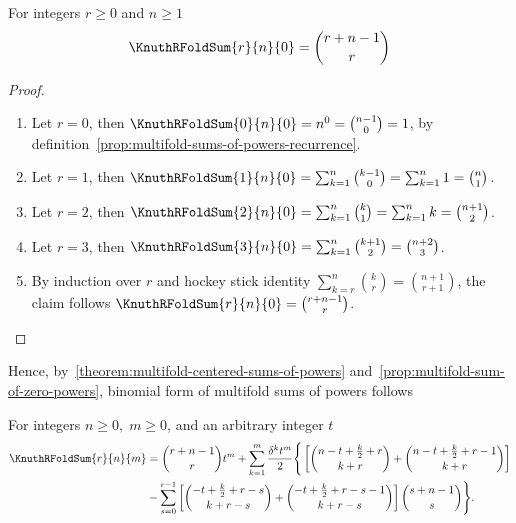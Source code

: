 \begin{proposition}
  \label{prop:multifold-sum-of-zero-powers}
  For integers $r \geq 0$ and $n\geq 1$
  \begin{align*}
    \KnuthRFoldSum{r}{n}{0} = \binom{r+n-1}{r}
  \end{align*}
  \begin{proof}
    \begin{enumerate}
      \item Let $r=0$, then $\KnuthRFoldSum{0}{n}{0}=n^0=\binom{n-1}{0} = 1$,
        by definition~\eqref{prop:multifold-sums-of-powers-recurrence}.
      \item Let $r=1$, then
        $\KnuthRFoldSum{1}{n}{0}
        = \sum_{k=1}^{n} \binom{k-1}{0}
        = \sum_{k=1}^{n} 1 = \binom{n}{1}$.
      \item Let $r=2$, then
        $\KnuthRFoldSum{2}{n}{0}= \sum_{k=1}^{n} \binom{k}{1}
        = \sum_{k=1}^{n} k = \binom{n+1}{2}$.
      \item Let $r=3$, then
        $\KnuthRFoldSum{3}{n}{0}
        = \sum_{k=1}^{n} \binom{k+1}{2}
        = \binom{n+2}{3}$.
      \item By induction over $r$ and hockey stick identity
        $\sum_{k=r}^{n} \binom{k}{r} = \binom{n+1}{r+1}$,
        the claim follows
        $\KnuthRFoldSum{r}{n}{0} = \binom{r+n-1}{r}$.
    \end{enumerate}
  \end{proof}
\end{proposition}
Hence, by~\eqref{theorem:multifold-centered-sums-of-powers}
and~\eqref{prop:multifold-sum-of-zero-powers},
binomial form of multifold sums of powers
follows
\begin{proposition}
  \label{prop:binomial-form-of-multifold-centered-sums-of-powers}
  For integers $n\geq 0, \; m \geq 0$, and an arbitrary integer $t$
  \begin{align*}
    \KnuthRFoldSum{r}{n}{m}
    &= \binom{r+n-1}{r} t^m
    + \sum_{k=1}^{m} \frac{\delta^{k} t^{m}}{2}
    \Bigg \{
      \left[
        \binom{n-t+\frac{k}{2}+r}{k+r}
        +
        \binom{n-t+\frac{k}{2}+r-1}{k+r}
      \right] \\
      &-
      \sum_{s=0}^{r-1}
      \left[
        \binom{-t+\frac{k}{2} + r -s}{k+r-s} +
        \binom{-t+\frac{k}{2} + r -s-1}{k+r-s}
      \right] \binom{s+n-1}{s}
    \Bigg \}.
  \end{align*}
\end{proposition}

